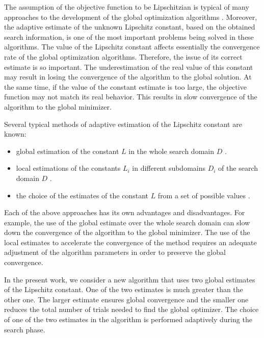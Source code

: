 \documentclass[runningheads]{llncs}
\begin{document}
The assumption of the objective function to be Lipschitzian is typical of many approaches to the development of the global optimization algorithms \cite{Evtushenko2013,Zilinskas2010,Pinter1996,Strongin2000}. Moreover, the adaptive estimate of the unknown Lipschitz constant, based on the obtained search information, is one of the most important problems being solved in these algorithms. 
The value of the Lipschitz constant affects essentially the convergence rate of the global optimization algorithms. Therefore, the issue of its correct estimate is so important. 
The underestimation of the real value of this constant may result in losing the convergence of the algorithm to the global solution. At the same time, if the value of the constant estimate is too large, the objective function may not match its real behavior. This results in  slow convergence of the algorithm to the global minimizer. 

Several typical methods of adaptive estimation of the Lipschitz constant are known:
\begin{itemize}
	\item global estimation of the constant $L$ in the whole search domain $D$ \cite{Horst1996,Pinter1996,Strongin2000}.
	\item local estimations of the constants $L_i$ in different subdomains $D_i$ of the search domain $D$ \cite{Kvasov2003,Sergeyev2010,Sergeyev2016}.
	\item the choice of the estimates of the constant $L$ from a set of possible values \cite{Gablonsky2001,Jones1993,Jones2009,Sergeyev2006}.
\end{itemize}

Each of the above approaches has its own advantages and disadvantages. For example, the use of the global estimate over the whole search domain can slow down the convergence of the algorithm to the global minimizer. The use of the local estimates to accelerate the convergence of the method requires an adequate adjustment of the algorithm parameters in order to preserve the global convergence. 

In the present work, we  consider a new algorithm that uses two global estimates of the Lipschitz constant. One of the two estimates is much greater than the other one. 
The larger estimate ensures global convergence and the smaller one reduces the total number of trials needed to find the global optimizer.
The choice of one of the two estimates in the algorithm is performed adaptively during the search phase.
\end{document}
